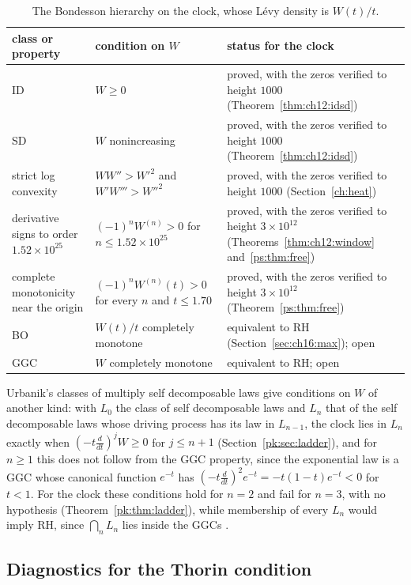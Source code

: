 \begin{table}[htbp]
\centering\small
\begin{tabular}{p{}p{}p{}}
\toprule
class or property & condition on $W$ & status for the clock\\
\midrule
ID & $W\ge0$ & \raggedright proved, with the zeros verified to height $1000$ (Theorem~\ref{thm:ch12:idsd})\tabularnewline
SD & $W$ nonincreasing & \raggedright proved, with the zeros verified to height $1000$ (Theorem~\ref{thm:ch12:idsd})\tabularnewline
strict log convexity & \raggedright ${WW''>W'^2}$ and ${W'W'''>W''^2}$ & \raggedright proved, with the zeros verified to height $1000$ (Section~\ref{ch:heat})\tabularnewline
\raggedright derivative signs to order $1.52\times10^{25}$ & $(-1)^nW^{(n)}>0$ for $n\le1.52\times10^{25}$ & \raggedright proved, with the zeros verified to height $3\times10^{12}$ (Theorems~\ref{thm:ch12:window} and~\ref{ps:thm:free})\tabularnewline
\raggedright complete monotonicity near the origin & $(-1)^nW^{(n)}(t)>0$ for every $n$ and $t\le1.70$ & \raggedright proved, with the zeros verified to height $3\times10^{12}$ (Theorem~\ref{ps:thm:free})\tabularnewline
BO & $W(t)/t$ completely monotone & \raggedright equivalent to RH (Section~\ref{sec:ch16:max}); open\tabularnewline
GGC & $W$ completely monotone & equivalent to RH; open\\
\bottomrule
\end{tabular}
\caption{The Bondesson hierarchy on the clock, whose L\'evy density is $W(t)/t$.}
\label{tab:ch3:hierarchy}
\end{table}

Urbanik's classes of multiply self decomposable laws give conditions on $W$ of another kind: with $L_0$ the class of self decomposable laws and $L_n$ that of the self decomposable laws whose driving process has its law in $L_{n-1}$, the clock lies in $L_n$ exactly when $(-t\frac d{dt})^jW\ge0$ for $j\le n+1$ (Section~\ref{pk:sec:ladder}), and for $n\ge1$ this does not follow from the GGC property, since the exponential law is a GGC whose canonical function $e^{-t}$ has $(-t\frac d{dt})^2e^{-t}=-t(1-t)e^{-t}<0$ for $t<1$. For the clock these conditions hold for $n=2$ and fail for $n=3$, with no hypothesis (Theorem~\ref{pk:thm:ladder}), while membership of every $L_n$ would imply RH, since $\bigcap_nL_n$ lies inside the GGCs \cite{BergForst83}.

\subsection{Diagnostics for the Thorin condition}\label{sec:ch3:diag}


